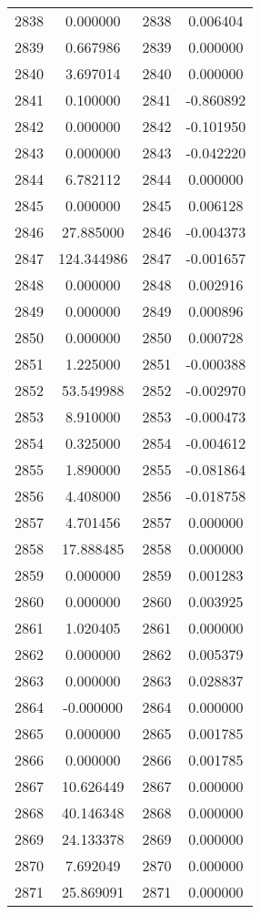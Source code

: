 \documentclass[12pt]{article}
\begin{document}
\begin{longtable}{@{}cccc@{}}
2838 & 0.000000 & 2838 & 0.006404 \\
2839 & 0.667986 & 2839 & 0.000000 \\
2840 & 3.697014 & 2840 & 0.000000 \\
2841 & 0.100000 & 2841 & -0.860892 \\
2842 & 0.000000 & 2842 & -0.101950 \\
2843 & 0.000000 & 2843 & -0.042220 \\
2844 & 6.782112 & 2844 & 0.000000 \\
2845 & 0.000000 & 2845 & 0.006128 \\
2846 & 27.885000 & 2846 & -0.004373 \\
2847 & 124.344986 & 2847 & -0.001657 \\
2848 & 0.000000 & 2848 & 0.002916 \\
2849 & 0.000000 & 2849 & 0.000896 \\
2850 & 0.000000 & 2850 & 0.000728 \\
2851 & 1.225000 & 2851 & -0.000388 \\
2852 & 53.549988 & 2852 & -0.002970 \\
2853 & 8.910000 & 2853 & -0.000473 \\
2854 & 0.325000 & 2854 & -0.004612 \\
2855 & 1.890000 & 2855 & -0.081864 \\
2856 & 4.408000 & 2856 & -0.018758 \\
2857 & 4.701456 & 2857 & 0.000000 \\
2858 & 17.888485 & 2858 & 0.000000 \\
2859 & 0.000000 & 2859 & 0.001283 \\
2860 & 0.000000 & 2860 & 0.003925 \\
2861 & 1.020405 & 2861 & 0.000000 \\
2862 & 0.000000 & 2862 & 0.005379 \\
2863 & 0.000000 & 2863 & 0.028837 \\
2864 & -0.000000 & 2864 & 0.000000 \\
2865 & 0.000000 & 2865 & 0.001785 \\
2866 & 0.000000 & 2866 & 0.001785 \\
2867 & 10.626449 & 2867 & 0.000000 \\
2868 & 40.146348 & 2868 & 0.000000 \\
2869 & 24.133378 & 2869 & 0.000000 \\
2870 & 7.692049 & 2870 & 0.000000 \\
2871 & 25.869091 & 2871 & 0.000000 \\

\end{longtable}
\end{document}
